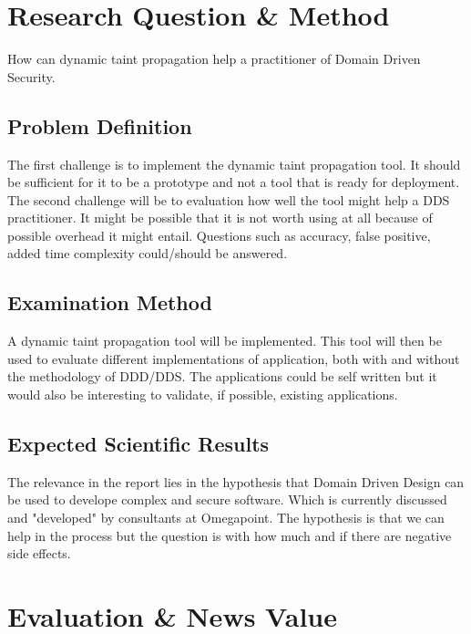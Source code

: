 \documentclass{../kththesis}
\begin{document}
\chapter{Research Question \& Method}
How can dynamic taint propagation help a practitioner of Domain Driven Security.


\section{Problem Definition}
The first challenge is to implement the dynamic taint propagation tool. It should be sufficient for it to be a prototype and not a tool that is ready for deployment. The second challenge will be to evaluation how well the tool might help a DDS practitioner. It might be possible that it is not worth using at all because of possible overhead it might entail. Questions such as accuracy, false positive, added time complexity could/should be answered.


\section{Examination Method}
A dynamic taint propagation tool will be implemented. This tool will then be used to evaluate different implementations of application, both with and without the methodology of DDD/DDS. The applications could be self written but it would also be interesting to validate, if possible, existing applications.


\section{Expected Scientific Results}
The relevance in the report lies in the hypothesis that Domain Driven Design can be used to develope complex and secure software. Which is currently discussed and "developed" by consultants at Omegapoint. The hypothesis is that we can help in the process but the question is with how much and if there are negative side effects. 



\chapter{Evaluation \& News Value}
\end{document}
